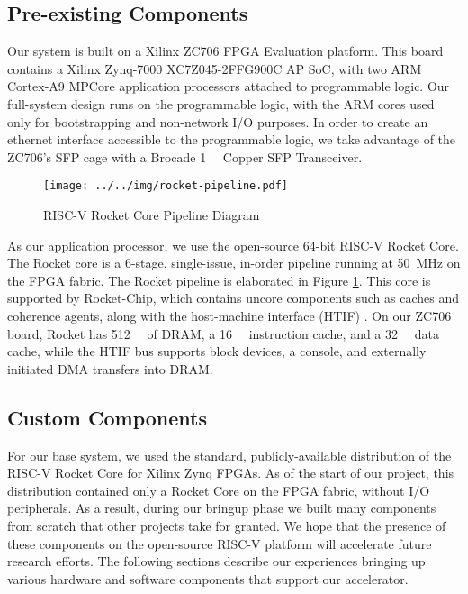\subsection{Pre-existing Components}
    Our system is built on a Xilinx ZC706 FPGA Evaluation platform. This board
    contains a Xilinx Zynq-7000 XC7Z045-2FFG900C AP SoC, with two ARM Cortex-A9
    MPCore application processors attached to programmable logic. Our full-system
    design runs on the programmable logic, with the ARM cores used only for 
    bootstrapping and non-network I/O purposes. In order to create an ethernet interface accessible
    to the programmable logic, we take advantage of the ZC706's SFP cage with a 
    Brocade \SI{1}{\giga\bit} Copper SFP Transceiver.

    
\begin{figure}[t]
\begin{center}
\label{fig:rocketpipe}
\texttt{[image: ../../img/rocket-pipeline.pdf]}
\caption{RISC-V Rocket Core Pipeline Diagram}
\end{center}
\end{figure}


    As our application processor, we use the open-source 64-bit RISC-V Rocket Core.
    The Rocket core is a
    6-stage, single-issue, in-order pipeline running at \SI{50}{\mega\hertz} on the FPGA fabric. The
    Rocket pipeline is elaborated in Figure \ref{fig:rocketpipe}. This 
    core is supported by Rocket-Chip, which contains uncore components such as
    caches and coherence agents, along with the host-machine interface (HTIF) \cite{rocket}.
    On our ZC706 board, Rocket has \SI{512}{\mebi\byte} of DRAM, a \SI{16}{\kibi\byte} instruction cache, and a
    \SI{32}{\kibi\byte} data cache, while the HTIF bus supports block devices, a console, and
    externally initiated DMA transfers into DRAM.

\subsection{Custom Components}
    For our base system, we used the standard, publicly-available 
    distribution of the RISC-V Rocket Core for Xilinx Zynq FPGAs. As of the 
    start of our project, this distribution contained only a Rocket Core on
    the FPGA fabric, without I/O peripherals. As a result, during our bringup phase 
    we built many components from scratch that other projects take for granted. We hope that
    the presence of these components on the open-source RISC-V platform
    will accelerate future research efforts. The following sections describe our
    experiences bringing up various hardware and software components that support
    our accelerator.

